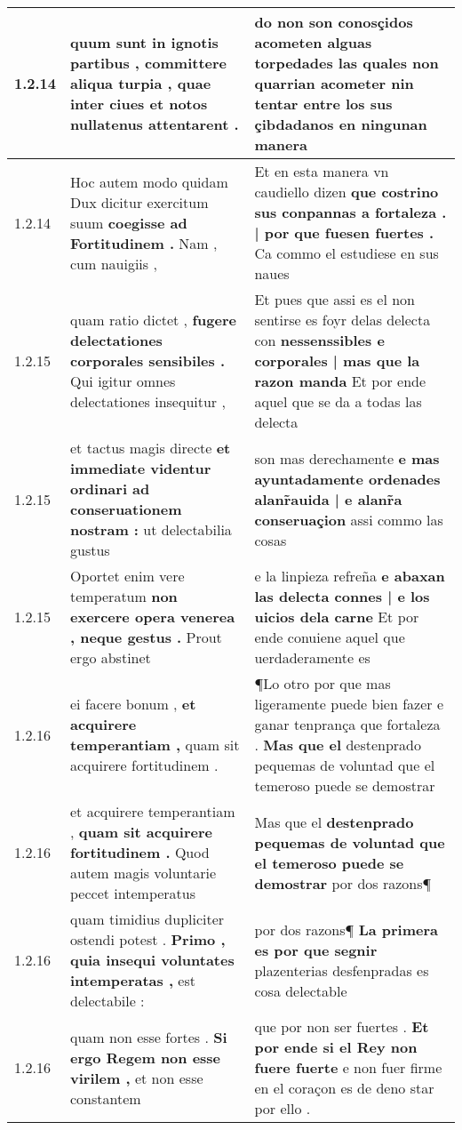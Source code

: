 \begin{tabular}{|p{1cm}|p{6.5cm}|p{6.5cm}|}
1.2.14 & quum sunt in ignotis partibus , \textbf{ committere aliqua turpia , } quae inter ciues et notos nullatenus attentarent . & do non son conosçidos \textbf{ acometen alguas torpedades } las quales non quarrian acometer nin tentar entre los sus çibdadanos en ningunan manera \\\hline
1.2.14 & Hoc autem modo quidam Dux dicitur exercitum suum \textbf{ coegisse ad Fortitudinem . } Nam , cum nauigiis , & Et en esta manera vn caudiello dizen \textbf{ que costrino sus conpannas a fortaleza . | por que fuesen fuertes . } Ca commo el estudiese en sus naues \\\hline
1.2.15 & quam ratio dictet , \textbf{ fugere delectationes corporales sensibiles . } Qui igitur omnes delectationes insequitur , & Et pues que assi es el non sentirse es foyr delas delecta con \textbf{ nessenssibles e corporales | mas que la razon manda } Et por ende aquel que se da a todas las delecta \\\hline
1.2.15 & et tactus magis directe \textbf{ et immediate videntur ordinari ad conseruationem nostram : } ut delectabilia gustus & son mas derechamente \textbf{ e mas ayuntadamente ordenades alanr̃auida | e alanr̃a conseruaçion } assi commo las cosas \\\hline
1.2.15 & Oportet enim vere temperatum \textbf{ non exercere opera venerea , neque gestus . } Prout ergo abstinet & e la linpieza refreña \textbf{ e abaxan las delecta connes | e los uicios dela carne } Et por ende conuiene aquel que uerdaderamente es \\\hline
1.2.16 & ei facere bonum , \textbf{ et acquirere temperantiam , } quam sit acquirere fortitudinem . & ¶Lo otro por que mas ligeramente puede bien fazer e ganar tenprança que fortaleza . \textbf{ Mas que el } destenprado pequemas de voluntad que el temeroso puede se demostrar \\\hline
1.2.16 & et acquirere temperantiam , \textbf{ quam sit acquirere fortitudinem . } Quod autem magis voluntarie peccet intemperatus & Mas que el \textbf{ destenprado pequemas de voluntad que el temeroso puede se demostrar } por dos razons¶ \\\hline
1.2.16 & quam timidius dupliciter ostendi potest . \textbf{ Primo , quia insequi voluntates intemperatas , } est delectabile : & por dos razons¶ \textbf{ La primera es por que segnir } plazenterias desfenpradas es cosa delectable \\\hline
1.2.16 & quam non esse fortes . \textbf{ Si ergo Regem non esse virilem , } et non esse constantem & que por non ser fuertes . \textbf{ Et por ende si el Rey non fuere fuerte } e non fuer firme en el coraçon es de deno star por ello . \\\hline

\end{tabular}
